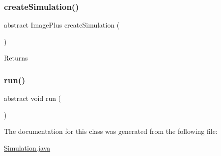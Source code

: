 \subsubsection{\texorpdfstring{create\+Simulation()}{createSimulation()}}
{\footnotesize\ttfamily abstract Image\+Plus create\+Simulation (\begin{DoxyParamCaption}{ }\end{DoxyParamCaption})\hspace{0.3cm}{\ttfamily [abstract]}}

\begin{DoxyReturn}{Returns}

\end{DoxyReturn}
\hypertarget{classdata_1_1_simulation_ad68e8feb22b9629629b377701c6ef3e7}{}\label{classdata_1_1_simulation_ad68e8feb22b9629629b377701c6ef3e7} 
\subsubsection{\texorpdfstring{run()}{run()}}
{\footnotesize\ttfamily abstract void run (\begin{DoxyParamCaption}{ }\end{DoxyParamCaption})\hspace{0.3cm}{\ttfamily [abstract]}}



The documentation for this class was generated from the following file\+:\begin{DoxyCompactItemize}
\item 
\hyperlink{_simulation_8java}{Simulation.\+java}\end{DoxyCompactItemize}
